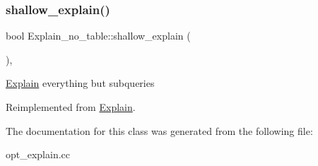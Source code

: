 \mbox{\label{classExplain__no__table_abb0311250686fc0cb30d9632150312eb}} 
\subsubsection{\texorpdfstring{shallow\+\_\+explain()}{shallow\_explain()}}
{\footnotesize\ttfamily bool Explain\+\_\+no\+\_\+table\+::shallow\+\_\+explain (\begin{DoxyParamCaption}{ }\end{DoxyParamCaption})\hspace{0.3cm}{\ttfamily [protected]}, {\ttfamily [virtual]}}

\mbox{\hyperlink{classExplain}{Explain}} everything but subqueries 

Reimplemented from \mbox{\hyperlink{classExplain_a2b5b074864b25d4bb669047dbcae8abb}{Explain}}.



The documentation for this class was generated from the following file\+:\begin{DoxyCompactItemize}
\item 
opt\+\_\+explain.\+cc\end{DoxyCompactItemize}
